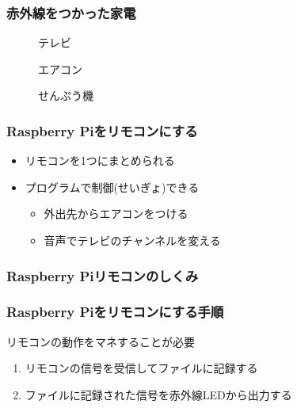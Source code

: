 \begin{frame}
    \frametitle{赤外線をつかった家電}
    \begin{figure}[H]
    \begin{minipage}[t]{0.3\columnwidth}
        \centering
    
        \caption{テレビ}
    \end{minipage}
    \begin{minipage}[t]{0.3\columnwidth}
        \centering
        
        \caption{エアコン}
    \end{minipage}
    \begin{minipage}[t]{0.3\columnwidth}
        \centering
        
        \caption{せんぷう機}
    \end{minipage}
    \end{figure}
\end{frame}

\begin{frame}
    \frametitle{Raspberry Piをリモコンにする}
    \begin{itemize}
        \item リモコンを1つにまとめられる
        \item プログラムで制御(せいぎょ)できる
        \begin{itemize}
            \item 外出先からエアコンをつける
            \item 音声でテレビのチャンネルを変える
        \end{itemize}
    \end{itemize}
\end{frame}

\begin{frame}
    \frametitle{Raspberry Piリモコンのしくみ}
    \centering
    
\end{frame}

\begin{frame}
    \frametitle{Raspberry Piをリモコンにする手順} 
    リモコンの動作をマネすることが必要
    \begin{enumerate}
        \item リモコンの信号を受信してファイルに記録する
        \item ファイルに記録された信号を赤外線LEDから出力する
    \end{enumerate}
\end{frame}

